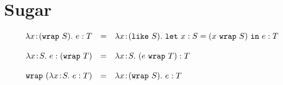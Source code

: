\documentclass{article}
\newcommand{\lam}[4]{\lambda#1\!:\!#2.\,\,#4:#3}
\newcommand{\lete}[4]{\t{let}~{#1}:{#2}={#3}~\t{in}~{#4}}
\renewcommand{\t}[1]{{\tt #1}}
\newcommand{\likety}[1]{\t{like}~#1}
\newcommand{\wrap}[2]{#1~\t{wrap}~#2}
\begin{document}
\clearpage
\section{Sugar}
\[
\begin{array}{rcl}

\lam{x}{(\t{wrap}~{S})}{T}{e} &=&
	\lam{x}{(\likety{S})}{T}
	    {\lete{x}{S}{(\wrap{x}{S})}{e}}
	    \\~\\
\lam{x}{S}{(\t{wrap}~T)}{e} &=&
	\lam{x}{S}{T}{(\wrap{e}{T})}
	\\~\\
\t{wrap}~(\lam x S T e) &=&
	\lam{x}{(\t{wrap}~S)}Te
\end{array}
\]

\end{document}

